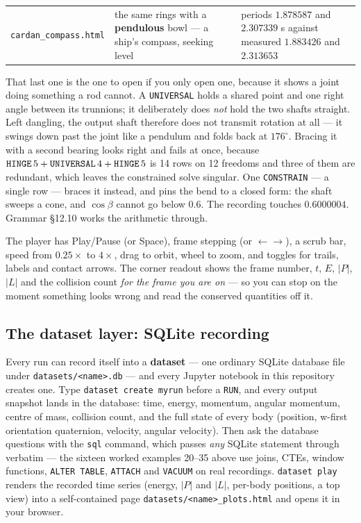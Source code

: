 \documentclass[11pt]{article}
\newcommand{\kw}[1]{\texttt{\uppercase{#1}}}
\newcommand{\code}[1]{\texttt{#1}}
\begin{document}
\begin{center}
\begin{tabular}{p{3.6cm}p{6.0cm}p{4.6cm}}
\code{cardan\_compass.html} & the same rings with a
\textbf{pendulous} bowl --- a ship's compass, seeking level &
periods $1.878587$ and $2.307339$ s against measured $1.883426$ and
$2.313653$\\
\end{tabular}
\end{center}

That last one is the one to open if you only open one, because it shows
a joint doing something a rod cannot. A \kw{universal} holds a shared
point and one right angle between its trunnions; it deliberately does
\emph{not} hold the two shafts straight. Left dangling, the output
shaft therefore does not transmit rotation at all --- it swings down
past the joint like a pendulum and folds back at $176^\circ$. Bracing
it with a second bearing looks right and fails at once, because
$\kw{hinge}\,5 + \kw{universal}\,4 + \kw{hinge}\,5$ is 14 rows on 12
freedoms and three of them are redundant, which leaves the constrained
solve singular. One \kw{constrain} --- a single row --- braces it
instead, and pins the bend to a closed form: the shaft sweeps a cone,
and $\cos\beta$ cannot go below $0.6$. The recording touches
$0.6000004$. Grammar \S12.10 works the arithmetic through.

The player has Play/Pause (or Space), frame stepping (or
$\leftarrow\rightarrow$), a scrub bar, speed from $0.25\times$ to
$4\times$, drag to orbit, wheel to zoom, and toggles for trails, labels
and contact arrows. The corner readout shows the frame number, $t$, $E$,
$|P|$, $|L|$ and the collision count \emph{for the frame you are on} ---
so you can stop on the moment something looks wrong and read the
conserved quantities off it.

\subsection{The dataset layer: SQLite recording}\label{sec:datasets}

Every run can record itself into a \textbf{dataset} --- one ordinary
SQLite database file under \code{datasets/<name>.db} --- and every
Jupyter notebook in this repository creates one. Type \code{dataset
create myrun} before a \kw{run}, and every output snapshot lands in
the database: time, energy, momentum, angular momentum, centre of
mass, collision count, and the full state of every body (position,
w-first orientation quaternion, velocity, angular velocity). Then ask
the database questions with the \code{sql} command, which passes
\emph{any} SQLite statement through verbatim --- the sixteen worked
examples 20--35 above use joins, CTEs, window functions, \code{ALTER
TABLE}, \code{ATTACH} and \code{VACUUM} on real recordings.
\code{dataset play} renders the recorded time series (energy, $|P|$
and $|L|$, per-body positions, a top view) into a self-contained page
\code{datasets/<name>\_plots.html} and opens it in your browser.
\end{document}
